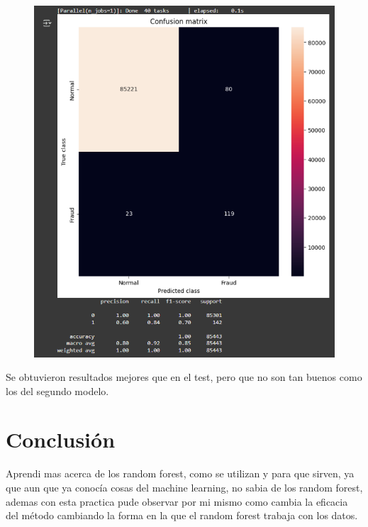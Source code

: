\begin{figure}[H]
    \centering
    \includegraphics[width=0.5\linewidth]{matriz2.png}
\end{figure}
Se obtuvieron resultados mejores que en el test, pero que no son tan buenos como los del segundo modelo.


\section{Conclusión}
Aprendi mas acerca de los random forest, como se utilizan y para que sirven, ya que aun que ya conocía cosas del machine learning, no sabia de los random forest, ademas con esta practica pude observar por mi mismo como cambia la eficacia del método cambiando la forma en la que el random forest trabaja con los datos.
